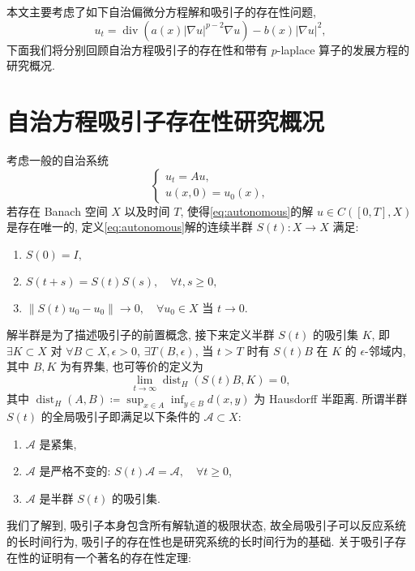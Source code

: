 \documentclass[oneside,longtitle]{LZUthesis}
\numberwithin{equation}{chapter}
\newcommand*\abs[1]{\lvert#1\rvert}
\newcommand*\norm[1]{\lVert#1\rVert}
\DeclareMathOperator{\Div}{div}
\DeclareMathOperator{\dist}{dist}
\begin{document}
本文主要考虑了如下自治偏微分方程解和吸引子的存在性问题,
\begin{equation*}
	u_t = \Div(a(x)\abs{\nabla u}^{p-2}\nabla u) - b(x)\abs{\nabla u}^2,
\end{equation*}
下面我们将分别回顾自治方程吸引子的存在性和带有 $p$-laplace 算子的发展方程的研究概况.

\section{自治方程吸引子存在性研究概况}
考虑一般的自治系统
\begin{equation}\label{eq:autonomous}
	\begin{cases}
		u_t = Au,\\
		u(x, 0) = u_0(x),
	\end{cases}
\end{equation}
若存在 Banach 空间 $X$ 以及时间 $T$, 使得\cref{eq:autonomous}的解 $u \in C([0, T], X)$ 是存在唯一的,
定义\cref{eq:autonomous}解的连续半群 $S(t) \colon X \to X$ 满足:
\begin{enumerate}[itemindent = -1em]
	\item $S(0) = I,$
	\item $S(t + s) = S(t)S(s), \quad \forall t, s \geq 0,$
	\item $\norm{S(t)u_0 - u_0} \to 0, \quad\forall u_0 \in X$ 当 $t \to 0$.
\end{enumerate}
解半群是为了描述吸引子的前置概念, 接下来定义半群 $S(t)$ 的吸引集 $K$,
即 $\exists K \subset X$
对 $\forall B \subset X, \epsilon > 0$, $\exists T(B, \epsilon)$,
当 $t > T$ 时有 $S(t)B$ 在 $K$ 的 $\epsilon$-邻域内,
其中 $B, K$ 为有界集, 也可等价的定义为
\begin{equation*}
	\lim_{t \to \infty} \dist_H(S(t)B, K) = 0,
\end{equation*}
其中 $\dist_H(A, B) \coloneqq \sup_{x \in A}\inf_{y \in B}d(x, y)$ 为 Hausdorff 半距离.
所谓半群 $S(t)$ 的全局吸引子即满足以下条件的 $\mathcal{A} \subset X$:
\begin{enumerate}[itemindent = -1em]
	\item $\mathcal{A}$ 是紧集,
	\item $\mathcal{A}$ 是严格不变的: $S(t)\mathcal{A} = \mathcal{A}, \quad\forall t \geq 0$,
	\item $\mathcal{A}$ 是半群 $S(t)$ 的吸引集.
\end{enumerate}
我们了解到, 吸引子本身包含所有解轨道的极限状态,
故全局吸引子可以反应系统的长时间行为, 吸引子的存在性也是研究系统的长时间行为的基础.
关于吸引子存在性的证明有一个著名的存在性定理:
\end{document}
